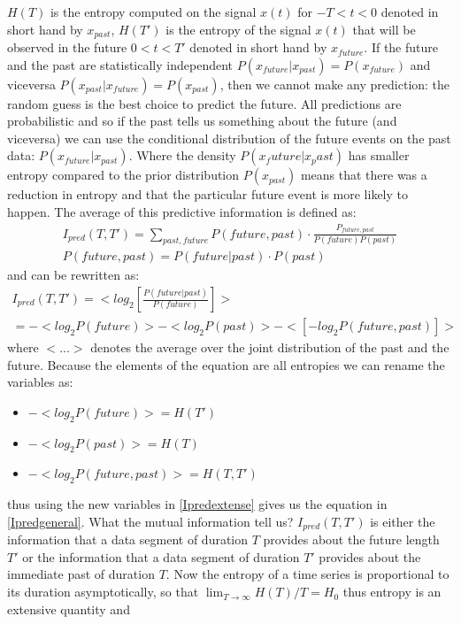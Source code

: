 $H(T)$ is the entropy computed on the signal $x(t)$ for $-T<t<0$ denoted in short
 hand by $x_{past}$, $H(T')$ is the entropy of the signal $x(t)$ that will be observed
 in the future $0<t<T'$ denoted in short hand by $x_{future}$. If the future and the
 past are statistically independent $P(x_{future}|x_{past})=P(x_{future})$
and viceversa $P(x_{past}|x_{future})=P(x_{past})$, then we cannot make any prediction:
the random guess is the best choice to predict the future. All predictions are
 probabilistic and so if the past tells us something about the future (and viceversa)
 we can use the conditional distribution of the future events on the past data:
$P(x_{future}|x_{past})$. Where the density $P(x_future|x_past)$ has smaller
entropy compared to the prior distribution $P(x_{past})$ means that there was
 a reduction in entropy and that the particular future event is more likely to happen.
The average of this predictive information is defined as:
\begin{eqnarray}
I_{pred}(T,T')=\sum_{past,future} P(future,past)\cdot \frac{P_{future,past}}{P(future) P(past)}\\
P(future,past)=P(future|past)\cdot P(past)
\end{eqnarray}
and can be rewritten as:
\begin{eqnarray}
 I_{pred}(T,T')=<log_2 [\frac{P(future|past)}{P(future)}]>\\
=-<log_2 P(future)> -<log_2 P(past)> -<[-log_2 P(future,past)]>\label{Ipredextense}
\end{eqnarray}
where $<...>$ denotes the average over the joint distribution of the past and the future.
Because the elements of the equation are all entropies we can rename the variables as:
\begin{itemize}
\item $-<log_2 P(future)>=H(T')$
\item $-<log_2 P(past)>=H(T)$
\item $-<log_2 P(future,past)>=H(T,T')$
\end{itemize}
thus using the new variables in \ref{Ipredextense} gives us the equation in \ref{Ipredgeneral}.
What the mutual information tell us?
$I_{pred}(T,T')$ is either the information that a data segment of duration $T$
provides about the future length $T'$ or the information that a data segment of
duration $T'$ provides about the immediate past of duration $T$.
Now the entropy of a time series is proportional to its duration asymptotically,
so that $\lim_{T\to\infty} H(T)/T=H_0$ thus entropy is an extensive quantity and
